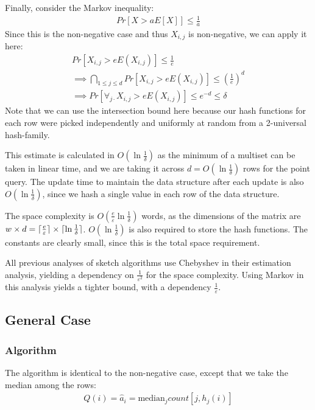\documentclass[11pt]{article}
\newcommand{\comment}[1]{}
\newcommand{\sq}{\mathit{Q}}
\DeclarePairedDelimiter\ceil{\lceil}{\rceil}
\begin{document}
Finally, consider the Markov inequality:
\begin{align}
    Pr[X > aE[X]] \leq \frac{1}{a}
\end{align}
Since this is the non-negative case and thus $X_{i, j}$ is non-negative, we can apply it here:
\begin{align}
    Pr[X_{i, j} > e E(X_{i, j})] \leq \frac{1}{e} \\
    \implies \bigcap_{1 \leq j \leq d} Pr[X_{i, j} > e E(X_{i, j})] \leq \left(\frac{1}{e}\right)^d \\
    \implies Pr[\forall_{j \cdot} X_{i, j} > e E(X_{i, j})] \comment{\leq \frac{E(X_{i, j})}{a_i + \varepsilon||a||_1} \leq \frac{\ceil{\frac{\varepsilon}{e}} ||\vec{a}||_1}{a_i + \varepsilon||a||_1}}
      \leq e^{-d} \leq \delta
\end{align}
Note that we can use the intersection bound here because our hash functions for
each row were picked independently and uniformly at random from a 2-universal
hash-family.

This estimate is calculated in $O(\ln \frac{1}{\delta})$ as the minimum of a
multiset can be taken in linear time, and we are taking it across $d = O(\ln
\frac{1}{\delta})$ rows for the point query.  The update time to maintain the
data structure after each update is also $O(\ln \frac{1}{\delta})$, since we
hash a single value in each row of the data structure.

The space complexity is $O\left({\frac{e}{\varepsilon}}{\ln
\frac{1}{\delta}}\right)$ words, as the dimensions of the matrix are $w \times d =
\ceil{\frac{e}{\varepsilon}}\times\ceil{\ln \frac{1}{\delta}}$.  $O(\ln
\frac{1}{\delta})$ is also required to store the hash functions.  The constants
are clearly small, since this is the total space requirement.

All previous analyses of sketch algorithms use Chebyshev in their estimation analysis, yielding a dependency on
$\frac{1}{\varepsilon^2}$ for the space complexity.  Using Markov in this analysis yields a tighter bound,
with a dependency $\frac{1}{\varepsilon}$.

\subsection{General Case}
\subsubsection{Algorithm}
The algorithm is identical to the non-negative case, except that we take the median among the rows:
\begin{align}
    \sq(i) = \hat{a}_i = \text{median}_j count[j, h_j(i)]
\end{align}
\end{document}
